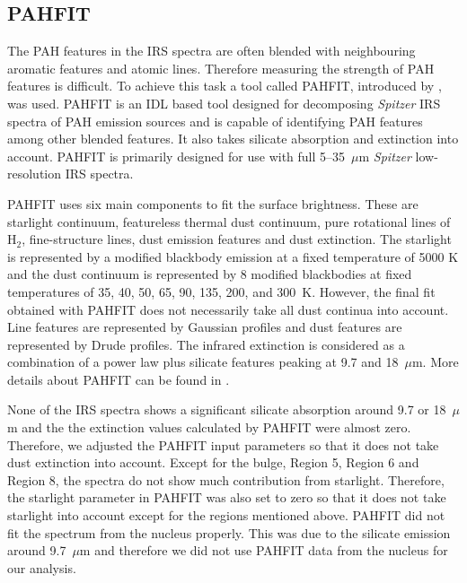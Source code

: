\subsection{PAHFIT}

The PAH features in the IRS spectra are often blended with neighbouring aromatic features and atomic lines. Therefore measuring the strength of PAH features is difficult. To achieve this task a tool called PAHFIT, introduced by \citet{Smith:2007lr}, was used. PAHFIT is an IDL  based tool designed for decomposing {\em Spitzer} IRS spectra of PAH emission sources and is capable of identifying PAH features among other blended features. It also takes silicate absorption and extinction into account. PAHFIT is primarily designed for use with full 5--35~$\mu$m {\em Spitzer} low-resolution IRS spectra.

PAHFIT uses six main components to fit the surface brightness. These are starlight continuum, featureless thermal dust continuum, pure rotational lines of H$_2$, fine-structure lines, dust emission features and dust extinction. The starlight is represented by a modified blackbody emission at a fixed temperature of 5000 K and the dust continuum is represented by 8 modified blackbodies at fixed temperatures of 35, 40, 50, 65, 90, 135, 200, and 300~K. However, the final fit obtained with PAHFIT does not necessarily take all dust continua into account. Line features are represented by Gaussian profiles and dust features are represented by Drude profiles. The infrared extinction is considered as a combination of a power law plus silicate features peaking at 9.7 and 18~$\mu$m. More details about PAHFIT can be found in \citet{Smith:2007lr}.


None of the IRS spectra shows a significant silicate absorption around 9.7 or 18~$\mu$m and the the extinction values calculated by PAHFIT were almost zero. Therefore, we adjusted the PAHFIT input parameters so that it does not take dust extinction into account. Except for the bulge, Region 5, Region 6 and Region 8, the spectra do not show much contribution from starlight. 
Therefore, the starlight parameter in PAHFIT was also set to zero so that it does not take starlight into account except for the regions mentioned above. 
PAHFIT did not fit the spectrum from the nucleus properly. This was due to the silicate emission around 9.7~$\mu$m and therefore we did not use PAHFIT data from the nucleus for our analysis.

